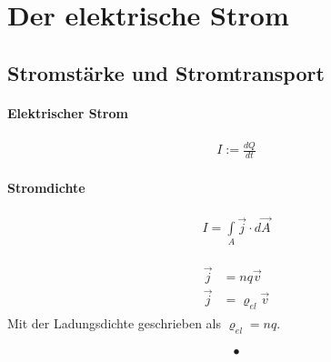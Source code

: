 \section{Der elektrische Strom}
\subsection{Stromstärke und Stromtransport}

\paragraph{Elektrischer Strom}
\begin{align} \label{def:Strom}
\boxed{I := \frac{dQ}{dt}}
\end{align}

\paragraph{Stromdichte}

\begin{align} 
I = \int \limits_A \vec{j} \cdot d\vec{A}
\end{align}


\begin{align} \label{eqn:Stromdichte}\begin{split}
\vec{j} &= nq\vec{v} \\
\vec{j}	&= \varrho_{el}\vec{v}\end{split}
\end{align}Mit der Ladungsdichte geschrieben als $\varrho_{el} =nq$.

\begin{align} \label{eqn:}
•
\end{align}
